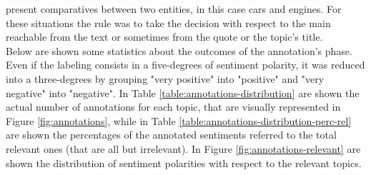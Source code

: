 present comparatives between two entities, in this case cars and engines. For these situations the rule was to take the decision with respect to the main reachable from the text or sometimes from the quote or the topic's title.\\

Below are shown some statistics about the outcomes of the annotation's phase. Even if the labeling consists in a five-degrees of sentiment polarity, it was reduced into a three-degrees by grouping "very positive" into "positive" and "very negative" into "negative".
In Table \ref{table:annotations-distribution} are shown the actual number of annotations for each topic, that are visually represented in Figure \ref{fig:annotations}, while in Table \ref{table:annotations-distribution-perc-rel} are shown the percentages of the annotated sentiments referred to the total relevant ones (that are all but irrelevant). In Figure \ref{fig:annotations-relevant} are shown the distribution of sentiment polarities with respect to the relevant topics.


